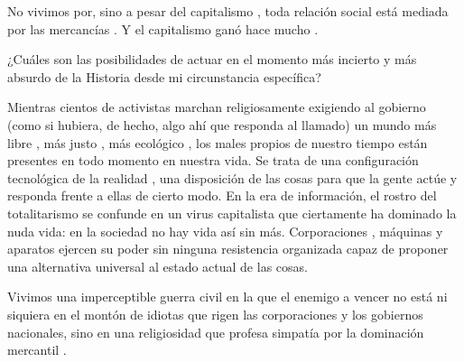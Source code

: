 No vivimos por, sino a pesar del capitalismo , toda relación social está mediada por las mercancías . Y el capitalismo ganó hace mucho .

¿Cuáles son las posibilidades de actuar en el momento más incierto y más absurdo de la Historia desde mi circunstancia específica?

Mientras cientos de activistas marchan religiosamente exigiendo al gobierno  (como si hubiera, de hecho, algo ahí que responda al llamado) un mundo más libre , más justo , más ecológico , los males propios de nuestro tiempo están presentes en todo momento en nuestra vida. Se trata de una configuración tecnológica de la realidad , una disposición de las cosas para que la gente actúe y responda frente a ellas de cierto modo. En la era de información, el rostro del totalitarismo se confunde en un virus capitalista  que ciertamente ha dominado la nuda vida: en la sociedad no hay vida así sin más. Corporaciones , máquinas  y aparatos ejercen su poder sin ninguna resistencia organizada capaz de proponer una alternativa universal al estado actual de las cosas.

Vivimos una imperceptible guerra civil  en la que el enemigo a vencer no está ni siquiera en el montón de idiotas que rigen las corporaciones y los gobiernos nacionales,  sino en una religiosidad  que profesa simpatía por la dominación mercantil .
